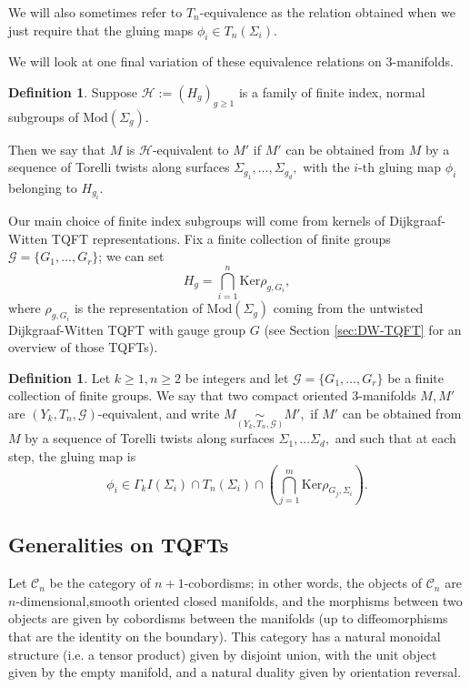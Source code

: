 \documentclass[12pt]{amsart}
\theoremstyle{definition}
\newtheorem{dfn}[thm]{Definition}
\begin{document}
We will also sometimes refer to $T_n$-equivalence as the relation obtained when we just require that the gluing maps $\phi_i\in T_n(\Sigma_i).$


We will look at one final variation of these equivalence relations on $3$-manifolds. 

\begin{dfn}\label{def:Hequiv}
Suppose $\mathcal{H}:=\left(H_{g}\right)_{g\geq 1}$ is a family of finite index, normal subgroups of $\mathrm{Mod}(\Sigma_{g})$.

Then we say that $M$ is $\mathcal{H}$-equivalent to $M'$ if $M'$ can be obtained from $M$ by a sequence of Torelli twists along surfaces $\Sigma_{g_1},\ldots, \Sigma_{g_d},$ with the $i$-th gluing map $\phi_i$ belonging to $H_{g_i}.$
\end{dfn}

Our main choice of finite index subgroups will come from kernels of Dijkgraaf-Witten TQFT representations. Fix a  finite collection of finite groups $\mathcal{G}=\lbrace G_1,\ldots ,G_r \rbrace$; we can set 
\[H_g=\underset{i=1}{\overset{n}{\bigcap}} \mathrm{Ker} \rho_{g,G_i},\]
where $\rho_{g,G_i}$ is the representation of $\mathrm{Mod}(\Sigma_g)$ coming from the untwisted Dijkgraaf-Witten TQFT with gauge group $G$ (see Section \ref{sec:DW-TQFT} for an overview of those TQFTs).

\begin{dfn}\label{def:YkTnGEquiv}
	Let $k\geq 1, n\geq 2$ be integers and let $\mathcal{G}=\lbrace G_1,\ldots ,G_r\rbrace$ be a finite collection of finite groups.
	We say that two compact oriented $3$-manifolds $M,M'$ are $(Y_k,T_n,\mathcal{G})$-equivalent, and write $M\underset{(Y_k,T_n,\mathcal{G})}{\sim}M',$ if $M'$ can be obtained from $M$ by a sequence of Torelli twists along surfaces $\Sigma_1,\ldots \Sigma_d,$ and such that at each step, the gluing map is 
	\[\phi_i \in \Gamma_k I(\Sigma_i)\cap T_n(\Sigma_i)\cap \left(\underset{j=1}{\overset{m}{\bigcap}}\mathrm{Ker} \rho_{G_j,\Sigma_i}\right).\]
\end{dfn}

\subsection{Generalities on TQFTs}
Let $\mathcal{C}_n$ be the category of $n+1$-cobordisms; in other words, the objects of $\mathcal{C}_n$ are $n$-dimensional,smooth oriented closed manifolds, and the morphisms between two objects are given by cobordisms between the manifolds (up to diffeomorphisms that are the identity on the boundary). This category has a natural monoidal structure (i.e. a tensor product) given by disjoint union, with the unit object given by the empty manifold, and a natural duality given by orientation reversal.
\end{document}
